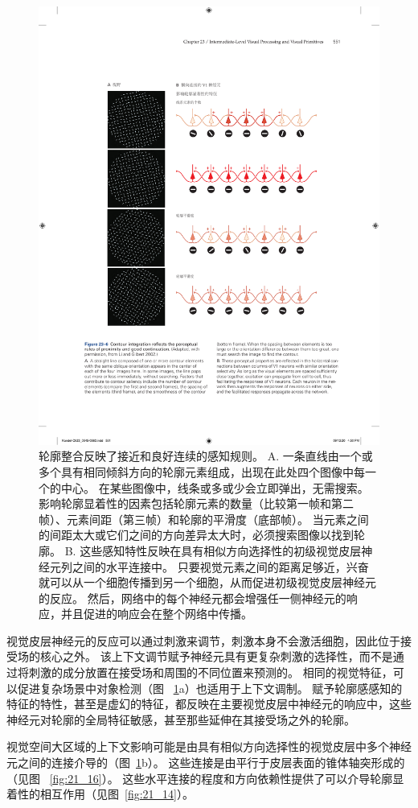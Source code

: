 \begin{figure}[htbp]
	\centering
	\includegraphics[width=0.75\linewidth]{chap23/fig_23_6}
	\caption{轮廓整合反映了接近和良好连续的感知规则\cite{li2002global}。
		A. 一条直线由一个或多个具有相同倾斜方向的轮廓元素组成，出现在此处四个图像中每一个的中心。
		在某些图像中，线条或多或少会立即弹出，无需搜索。
		影响轮廓显着性的因素包括轮廓元素的数量（比较第一帧和第二帧）、元素间距（第三帧）和轮廓的平滑度（底部帧）。
		当元素之间的间距太大或它们之间的方向差异太大时，必须搜索图像以找到轮廓。
		B. 这些感知特性反映在具有相似方向选择性的初级视觉皮层神经元列之间的水平连接中。
		只要视觉元素之间的距离足够近，兴奋就可以从一个细胞传播到另一个细胞，从而促进初级视觉皮层神经元的反应。
		然后，网络中的每个神经元都会增强任一侧神经元的响应，并且促进的响应会在整个网络中传播。}
	\label{fig:23_6}
\end{figure}


视觉皮层神经元的反应可以通过刺激来调节，刺激本身不会激活细胞，因此位于接受场的核心之外。
该上下文调节赋予神经元具有更复杂刺激的选择性，而不是通过将刺激的成分放置在接受场和周围的不同位置来预测的。
相同的视觉特征，可以促进复杂场景中对象检测（图 ~\ref{fig:23_6}a）也适用于上下文调制。
赋予轮廓感感知的特征的特性，甚至是虚幻的特征，都反映在主要视觉皮层中神经元的响应中，这些神经元对轮廓的全局特征敏感，甚至那些延伸在其接受场之外的轮廓。


视觉空间大区域的上下文影响可能是由具有相似方向选择性的视觉皮层中多个神经元之间的连接介导的（图~\ref{fig:23_6}b）。
这些连接是由平行于皮层表面的锥体轴突形成的（见图 ~\ref{fig:21_16}）。
这些水平连接的程度和方向依赖性提供了可以介导轮廓显着性的相互作用（见图~\ref{fig:21_14}）。


